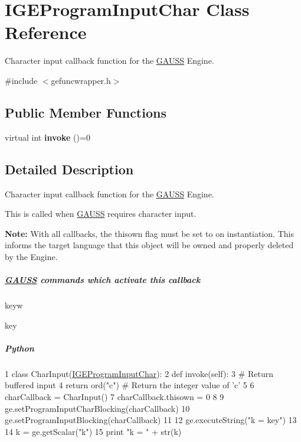 \hypertarget{class_i_g_e_program_input_char}{\section{I\-G\-E\-Program\-Input\-Char Class Reference}
\label{class_i_g_e_program_input_char}
}


Character input callback function for the \hyperlink{class_g_a_u_s_s}{G\-A\-U\-S\-S} Engine.  




{\ttfamily \#include $<$gefuncwrapper.\-h$>$}

\subsection*{Public Member Functions}
\begin{DoxyCompactItemize}
\item 
\hypertarget{class_i_g_e_program_input_char_a598db017e0c0456b09e8a32f9f635d08}{virtual int {\bfseries invoke} ()=0}\label{class_i_g_e_program_input_char_a598db017e0c0456b09e8a32f9f635d08}

\end{DoxyCompactItemize}


\subsection{Detailed Description}
Character input callback function for the \hyperlink{class_g_a_u_s_s}{G\-A\-U\-S\-S} Engine. 

This is called when \hyperlink{class_g_a_u_s_s}{G\-A\-U\-S\-S} requires character input.

{\bfseries Note\-:} With all callbacks, the {\ttfamily thisown} flag must be set to {} on instantiation. This informs the target language that this object will be owned and properly deleted by the Engine.

\subparagraph*{\hyperlink{class_g_a_u_s_s}{G\-A\-U\-S\-S} commands which activate this callback}


\begin{DoxyItemize}
\item {\ttfamily keyw}
\item {\ttfamily key}
\end{DoxyItemize}

\subparagraph*{Python}


\begin{DoxyCode}
1 \textcolor{keyword}{class }CharInput(\hyperlink{class_i_g_e_program_input_char}{IGEProgramInputChar}):
2     \textcolor{keyword}{def }invoke(self):
3         \textcolor{comment}{# Return buffered input}
4         \textcolor{keywordflow}{return} ord(\textcolor{stringliteral}{"c"}) \textcolor{comment}{# Return the integer value of 'c'}
5 
6 charCallback = CharInput()
7 charCallback.thisown = 0
8 
9 ge.setProgramInputCharBlocking(charCallback)
10 ge.setProgramInputBlocking(charCallback)
11 
12 ge.executeString(\textcolor{stringliteral}{"k = key"})
13 
14 k = ge.getScalar(\textcolor{stringliteral}{"k"})
15 \textcolor{keywordflow}{print} \textcolor{stringliteral}{"k = "} + str(k)
\end{DoxyCode}


